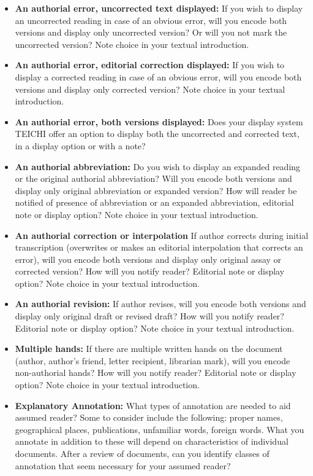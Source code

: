 \documentclass[9pt,oneside,notitlepageletterpaperopenright]{article}
\begin{document}
\begin{itemize}
\itemsep1pt\parskip0pt
\item
  \textbf{An authorial error, uncorrected text displayed:} If you wish
  to display an uncorrected reading in case of an obvious error, will
  you encode both versions and display only uncorrected version? Or will
  you not mark the uncorrected version? Note choice in your textual
  introduction.
\item
  \textbf{An authorial error, editorial correction displayed:} If you
  wish to display a corrected reading in case of an obvious error, will
  you encode both versions and display only corrected version? Note
  choice in your textual introduction.
\item
  \textbf{An authorial error, both versions displayed:} Does your
  display system TEICHI offer an option to display both the uncorrected
  and corrected text, in a display option or with a note?
\item
  \textbf{An authorial abbreviation:} Do you wish to display an expanded
  reading or the original authorial abbreviation? Will you encode both
  versions and display only original abbreviation or expanded version?
  How will reader be notified of presence of abbreviation or an expanded
  abbreviation, editorial note or display option? Note choice in your
  textual introduction.
\item
  \textbf{An authorial correction or interpolation} If author corrects
  during initial transcription (overwrites or makes an editorial
  interpolation that corrects an error), will you encode both versions
  and display only original assay or corrected version? How will you
  notify reader? Editorial note or display option? Note choice in your
  textual introduction.
\item
  \textbf{An authorial revision:} If author revises, will you encode
  both versions and display only original draft or revised draft? How
  will you notify reader? Editorial note or display option? Note choice
  in your textual introduction.\\
\item
  \textbf{Multiple hands:} If there are multiple written hands on the
  document (author, author's friend, letter recipient, librarian mark),
  will you encode non-authorial hands? How will you notify reader?
  Editorial note or display option? Note choice in your textual
  introduction.
\item
  \textbf{Explanatory Annotation:} What types of annotation are needed
  to aid assumed reader? Some to consider include the following: proper
  names, geographical places, publications, unfamiliar words, foreign
  words. What you annotate in addition to these will depend on
  characteristics of individual documents. After a review of documents,
  can you identify classes of annotation that seem necessary for your
  assumed reader?
\end{itemize}
\end{document}
